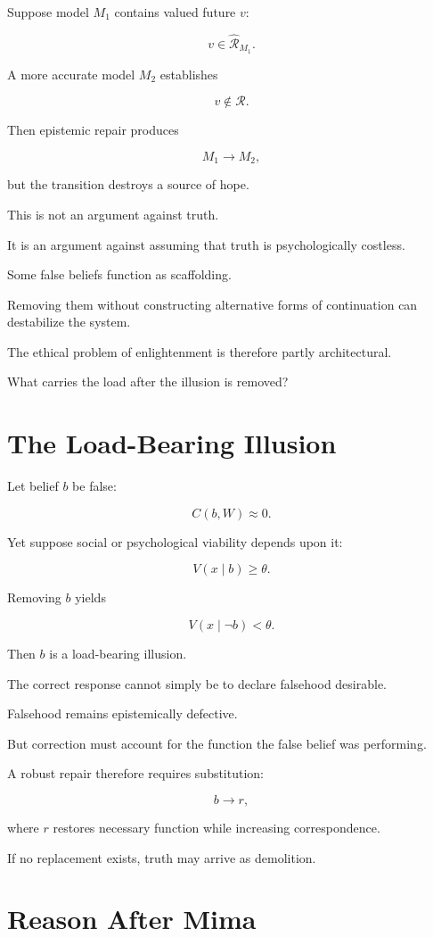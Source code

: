 \documentclass[11pt,oneside]{book}
\theoremstyle{definition}
\theoremstyle{remark}
\newcommand{\R}{\mathcal{R}}
\begin{document}
Suppose model \(M_1\) contains valued future \(v\):

\[
v\in\widehat{\R}_{M_1}.
\]

A more accurate model \(M_2\) establishes

\[
v\notin\R.
\]

Then epistemic repair produces

\[
M_1\rightarrow M_2,
\]

but the transition destroys a source of hope.

This is not an argument against truth.

It is an argument against assuming that truth is psychologically costless.

Some false beliefs function as scaffolding.

Removing them without constructing alternative forms of continuation can destabilize the system.

The ethical problem of enlightenment is therefore partly architectural.

What carries the load after the illusion is removed?

\section{The Load-Bearing Illusion}

Let belief \(b\) be false:

\[
C(b,W)\approx0.
\]

Yet suppose social or psychological viability depends upon it:

\[
V(x\mid b)\geq\theta.
\]

Removing \(b\) yields

\[
V(x\mid\neg b)<\theta.
\]

Then \(b\) is a load-bearing illusion.

The correct response cannot simply be to declare falsehood desirable.

Falsehood remains epistemically defective.

But correction must account for the function the false belief was performing.

A robust repair therefore requires substitution:

\[
b
\rightarrow
r,
\]

where \(r\) restores necessary function while increasing correspondence.

If no replacement exists, truth may arrive as demolition.

\section{Reason After Mima}
\end{document}
